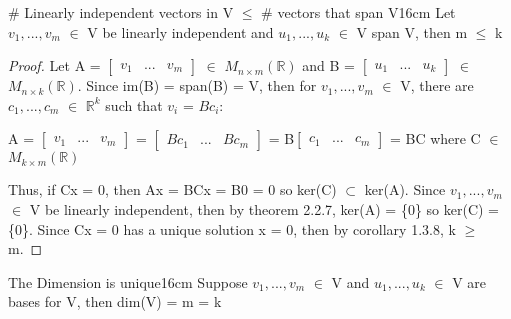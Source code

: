     \vspace{0.5cm}



    \begin{wtheorem}{\# Linearly independent vectors in V $\leq$
    \# vectors that span V}{16cm}
        Let $v_1,...,v_m$ $\in$ V be linearly independent
        and $u_1,...,u_k$ $\in$ V span V, then m $\leq$ k
    \end{wtheorem}

    \begin{proof}
        Let A =
        $\begin{bmatrix}
            v_1 & ... & v_m
        \end{bmatrix}$ $\in$ $M_{n \times m}(\mathbb{R})$
        and B =
        $\begin{bmatrix}
            u_1 & ... & u_k
        \end{bmatrix}$ $\in$ $M_{n \times k}(\mathbb{R})$.
        Since im(B) = span(B) = V, then for $v_1,...,v_m$ $\in$ V, there are
        $c_1,...,c_m$ $\in$ $\mathbb{R}^k$ such that $v_i$ = $Bc_i$:

        \hspace{0.5cm}
        A =
        $\begin{bmatrix}
            v_1 & ... & v_m
        \end{bmatrix}$ =
        $\begin{bmatrix}
            Bc_1 & ... & Bc_m
        \end{bmatrix}$ =
        B$\begin{bmatrix}
            c_1 & ... & c_m
        \end{bmatrix}$
        = BC
        \hspace{0.5cm}
        where C $\in$ $M_{k \times m}(\mathbb{R})$

        Thus, if Cx = 0, then Ax = BCx = B0 = 0 so ker(C) $\subset$ ker(A).
        Since $v_1,...,v_m$ $\in$ V be linearly independent, then by
        {\color{red} theorem 2.2.7}, ker(A) = \{0\} so ker(C) = \{0\}.
        Since Cx = 0 has a unique solution x = 0, then by
        {\color{orange} corollary 1.3.8}, k $\geq$ m.
    \end{proof}

    \newpage



    \begin{corollary}{The Dimension is unique}{16cm}
        Suppose $v_1,...,v_m$ $\in$ V and
        $u_1,...,u_k$ $\in$ V are bases for V, then dim(V) = m = k
    \end{corollary}

